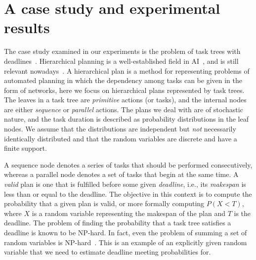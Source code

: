 \documentclass{article}
\begin{document}
	



\section{A case study and experimental results}\label{sec:exp}
The case study examined in our experiments is the problem of task trees with deadlines~\cite{cohen2015estimating,CohenGW18}. Hierarchical planning is a well-established field in AI~\cite{thomas1988hierarchical,erol1994htn,erol1996complexity}, and is still relevant nowadays~\cite{alford2016hierarchical,xiao2017hierarchical}. A hierarchical plan is a method for representing problems of automated planning in which the dependency among tasks can be given in the form of networks, here we focus on hierarchical plans represented by task trees. The leaves in a task tree are \emph{primitive} actions (or tasks), and the internal nodes are either \emph{sequence} or \emph{parallel} actions. The plans we deal with are of stochastic nature, and the task duration is described as probability distributions in the leaf nodes. We assume that the distributions are independent but {\em not} necessarily identically distributed and that the random variables are discrete and have a finite support. 


A sequence node denotes a series of tasks that should be performed consecutively, whereas a parallel node denotes a set of tasks that begin at the same time. A \emph{valid} plan is one that is fulfilled before some given \emph{deadline}, i.e., its \emph{makespan} is less than or equal to the deadline. The objective in this context is to compute the probability that a given plan is valid, or more formally computing $P(X<T)$, where $X$ is a random variable representing the makespan of the plan and $T$ is the deadline. The problem of finding the probability that a task tree satisfies a deadline is known to be NP-hard. In fact, even the problem of summing a set of random variables is NP-hard~\cite{mohring2001scheduling}. This is an example of an explicitly given random variable that we need to estimate deadline meeting probabilities for.
\end{document}
